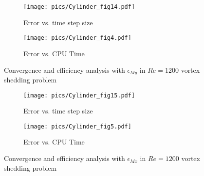 \documentclass[preprint,12pt]{elsarticle}
\begin{document}


\begin{figure}[htbp]
    \centering
    \begin{subfigure}{0.5\textwidth}
        \texttt{[image: pics/Cylinder\_fig14.pdf]}
        \caption[]{Error vs. time step size}
        \label{sfig:CylinderRe1200_My_C}
    \end{subfigure}\hfill
    \begin{subfigure}{0.5\textwidth}
        \texttt{[image: pics/Cylinder\_fig4.pdf]}
        \caption[]{Error vs. CPU Time}
        \label{sfig:CylinderRe1200_My_E}
    \end{subfigure}
    \caption[]{Convergence and efficiency analysis with $\epsilon_{My}$ in $Re=1200$ vortex shedding problem}
    \label{fig:CylinderRe1200_My}
\end{figure}

\begin{figure}[htbp]
    \centering
    \begin{subfigure}{0.5\textwidth}
        \texttt{[image: pics/Cylinder\_fig15.pdf]}
        \caption[]{Error vs. time step size}
        \label{sfig:CylinderRe1200_Mx_C}
    \end{subfigure}\hfill
    \begin{subfigure}{0.5\textwidth}
        \texttt{[image: pics/Cylinder\_fig5.pdf]}
        \caption[]{Error vs. CPU Time}
        \label{sfig:CylinderRe1200_Mx_E}
    \end{subfigure}
    \caption[]{Convergence and efficiency analysis with $\epsilon_{Mx}$ in $Re=1200$ vortex shedding problem}
    \label{fig:CylinderRe1200_Mx}
\end{figure}
\end{document}
